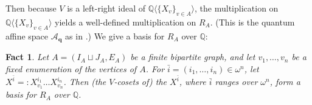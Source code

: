 \documentclass{amsart}
\newtheorem{fact}[theorem]{Fact}
\theoremstyle{definition}
\theoremstyle{remark}
\numberwithin{equation}{section}
\begin{document}
Then because $V$ is a left-right ideal of $\mathbb{Q}\langle\{ X_{v} \}_{v \in A} \rangle $, the multiplication on $\mathbb{Q}\langle\{ X_{v} \}_{v \in A} \rangle $ yields a well-defined multiplication on $R_{A}$. (This is the quantum affine space $\mathcal{A}_{\mathbf{q}}$ as in \cite{Goodearl2024Binomial}.) We give a basis for $R_{A}$ over $\mathbb{Q}$:

\begin{fact}\label{ordered basis}
Let $A = (I_{A} \sqcup J_{A}, E_{A})$ be a finite bipartite graph, and let $v_{1}, \ldots, v_{n}$ be a fixed enumeration of the vertices of $A$. For $\bar{i} = (i_{1}, \ldots, i_{n}) \in \omega^{n} $, let $X^{\bar{i}} =: X_{v_{1}}^{i_{1}} \ldots X_{v_{n}}^{i_{n}}$. Then (the $V$-cosets of) the $X^{\bar{i}}$, where $\bar{i}$ ranges over $\omega^{n}$, form a basis for $R_{A}$ over $\mathbb{Q}$.
\end{fact}
\end{document}
